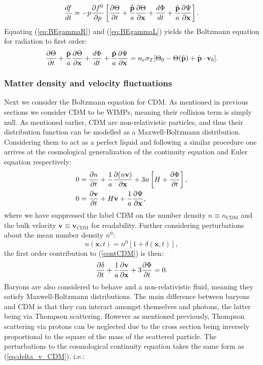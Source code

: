 \documentclass[%
reprint,
 amsmath,amssymb,
 aps,
]{revtex4-2}
\begin{document}
\begin{equation}
	\frac{df}{dt}=-p\pdv{f^0}{p}\left[\pdv{\Theta}{t}+\frac{\hat{\textbf{p}}}{a}\pdv{\Theta}{\textbf{x}}+\frac{d\Phi}{dt}+\frac{\hat{\textbf{p}}}{a}\pdv{\Psi}{\textbf{x}} \right].
	\label{eq:BEgammaL}
\end{equation}
Equating (\ref{eq:BEgammaR}) and (\ref{eq:BEgammaL}) yields the Boltzmann equation for radiation to first order:
\begin{equation}
	\pdv{\Theta}{t}+\frac{\hat{\textbf{p}}}{a}\pdv{\Theta}{\textbf{x}}+\frac{d\Phi}{dt}+\frac{\hat{\textbf{p}}}{a}\pdv{\Psi}{\textbf{x}}=n_e\sigma_T[\Theta_0-\Theta(\hat {\textbf{p}})+\hat{\textbf{p}}\cdot\textbf{v}_b].
	\label{eq:BEgamma}
\end{equation}
\subsubsection{Matter density and velocity fluctuations}
Next we consider the Boltzmann equation for CDM. As mentioned in previous sections we consider CDM to be WIMPs, meaning their collision term is simply null. As mentioned earlier, CDM are non-relativistic particles, and thus their distribution function can be modelled as a Maxwell-Boltzmann distribution. Considering them to act as a perfect liquid and following a similar procedure one arrives at the cosmological generalization of the continuity equation and Euler equation respectively:
\begin{align}
	0&=\pdv{n}{t}+\frac{1}{a}\pdv{(n\textbf{v})}{\textbf{x}}+3n\left[H+\pdv{\Phi}{t}\right],
	\label{eq:contCDM}\\
	0&=\pdv{\textbf{v}}{t}+H\textbf{v}+\frac{1}{a}\pdv{\Psi}{\textbf{x}},
\end{align}
where we have suppressed the label CDM on the number density $n\equiv n_{\text{CDM}}$ and the bulk velocity $\textbf{v}\equiv \textbf{v}_\text{CDM}$ for readability. Further considering perturbations about the mean number density $n^0$:
\[n(\textbf{x},t)=n^0[1+\delta(\textbf{x},t)],\]
the first order contribution to (\ref{contCDM}) is then:
\begin{equation}
	\pdv{\delta}{t}+\frac{1}{a}\pdv{\textbf{v}}{\textbf{x}}+3\pdv{\Phi}{t}=0.
	\label{eq:delta_v_CDM}
\end{equation}
Baryons are also considered to behave and a non-relativistic fluid, meaning they satisfy Maxwell-Boltzmann distributions. The main difference between baryons and CDM is that they can interact amongst themselves and photons, the latter being via Thompson scattering. However as mentioned previously, Thompson scattering via protons can be neglected due to the cross section being inversely proportional to the square of the mass of the scattered particle. The perturbations to the cosmological continuity equation takes the same form as (\ref{eq:delta_v_CDM}), i.e.:
\end{document}
